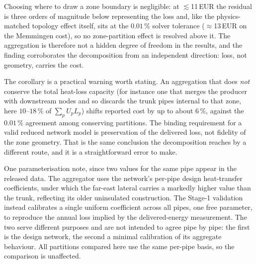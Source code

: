 

Choosing where to draw a zone boundary is negligible: at $\lesssim$11\,EUR the residual is
three orders of magnitude below representing the loss and, like the physics-matched topology
effect itself, sits at the $0.01$\,\% solver tolerance
($\approx$13\,EUR on the Memmingen cost), so no zone-partition effect is resolved
above it. The aggregation is therefore not a hidden degree
of freedom in the results, and the finding corroborates the decomposition from an
independent direction: loss, not geometry, carries the cost.

The corollary is a practical warning worth stating. An aggregation that does \emph{not}
conserve the total heat-loss capacity (for instance one that merges the producer with
downstream nodes and so discards the trunk pipes internal to that zone, here $10$--$18$\,\%
of $\sum_p U_p L_p$) shifts reported cost by up to about $6$\,\%, against the $0.01$\,\%
agreement among conserving partitions. The binding requirement for a valid reduced network
model is preservation of the delivered loss, not fidelity of the zone geometry. That is the
same conclusion the decomposition reaches by a different route, and it is a straightforward
error to make.

One parameterisation note, since two values for the same pipe appear in the released data.
The aggregator uses the network's per-pipe design heat-transfer coefficients, under which
the far-east lateral carries a markedly higher value than the trunk, reflecting its older
uninsulated construction. The Stage-1 validation instead calibrates a single uniform
coefficient across all pipes, one free parameter, to reproduce the annual loss implied by the delivered-energy measurement.
The two serve different purposes and are not intended to agree pipe by pipe: the first is
the design network, the second a minimal calibration of its aggregate behaviour. All
partitions compared here use the same per-pipe basis, so the comparison is unaffected.
